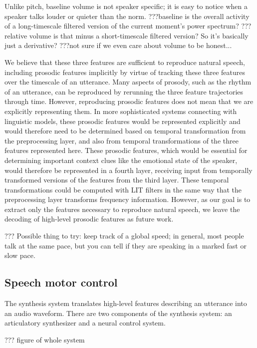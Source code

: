Unlike pitch, baseline volume
is not speaker specific;
it is easy to notice when a speaker
talks louder or quieter
than the norm.
???baseline is the overall activity
of a long-timescale filtered version
of the current moment's power spectrum?
???relative volume is that minus a
short-timescale filtered version?
So it's basically just a derivative?
???not sure if we even care about volume
to be honest...

We believe that these three features
are sufficient to reproduce natural speech,
including prosodic features implicitly
by virtue of tracking these three features
over the timescale of an utterance.
Many aspects of prosody,
such as the rhythm of an utterance,
can be reproduced by rerunning
the three feature trajectories through time.
However, reproducing prosodic features
does not mean that we are explicitly
representing them.
In more sophisticated systems
connecting with linguistic models,
these prosodic features would
be represented explicitly
and would therefore need to be
determined based on temporal transformation
from the preprocessing layer,
and also from temporal transformations
of the three features represented here.
These prosodic features,
which would be essential for determining
important context clues
like the emotional state of the speaker,
would therefore be represented in
a fourth layer, receiving input from
temporally transformed versions of
the features from the third layer.
These temporal transformations
could be computed with LIT filters
in the same way that the preprocessing layer
transforms frequency information.
However, as our goal is to
extract only the features necessary
to reproduce natural speech,
we leave the decoding of high-level prosodic features
as future work.

??? Possible thing to try: keep track of a global
speed; in general, most people talk at the same pace,
but you can tell if they are speaking in a
marked fast or slow pace.

\subsection{Speech motor control}

The synthesis system translates
high-level features describing an utterance
into an audio waveform.
There are two components of the synthesis system:
an articulatory synthesizer and a neural control system.

??? figure of whole system

